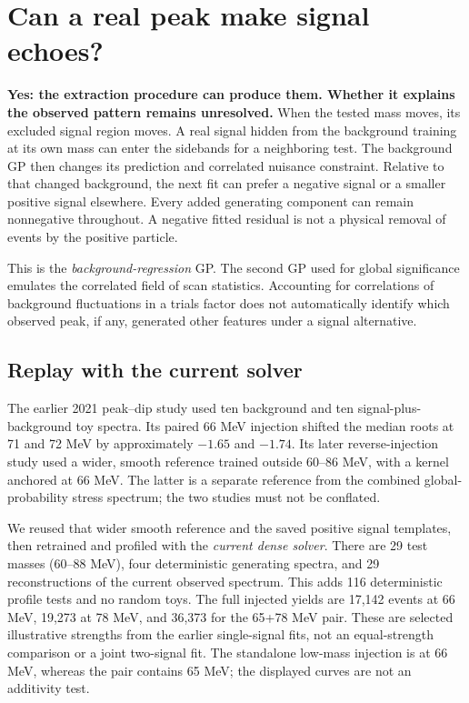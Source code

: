 \section{Can a real peak make signal echoes?}
\label{sec:echo}
\textbf{Yes: the extraction procedure can produce them. Whether it explains the observed pattern remains unresolved.} When the tested mass moves, its excluded signal region moves. A real signal hidden from the background training at its own mass can enter the sidebands for a neighboring test. The background GP then changes its prediction and correlated nuisance constraint. Relative to that changed background, the next fit can prefer a negative signal or a smaller positive signal elsewhere. Every added generating component can remain nonnegative throughout. A negative fitted residual is not a physical removal of events by the positive particle.

This is the \emph{background-regression} GP. The second GP used for global significance emulates the correlated field of scan statistics. Accounting for correlations of background fluctuations in a trials factor does not automatically identify which observed peak, if any, generated other features under a signal alternative.

\subsection*{Replay with the current solver}
The earlier 2021 peak--dip study used ten background and ten signal-plus-background toy spectra. Its paired 66 MeV injection shifted the median roots at 71 and 72 MeV by approximately $-1.65$ and $-1.74$. Its later reverse-injection study used a wider, smooth reference trained outside 60--86 MeV, with a kernel anchored at 66 MeV. The latter is a separate reference from the combined global-probability stress spectrum; the two studies must not be conflated.

We reused that wider smooth reference and the saved positive signal templates, then retrained and profiled with the \emph{current dense solver}. There are 29 test masses (60--88 MeV), four deterministic generating spectra, and 29 reconstructions of the current observed spectrum. This adds 116 deterministic profile tests and no random toys. The full injected yields are 17,142 events at 66 MeV, 19,273 at 78 MeV, and 36,373 for the 65+78 MeV pair. These are selected illustrative strengths from the earlier single-signal fits, not an equal-strength comparison or a joint two-signal fit. The standalone low-mass injection is at 66 MeV, whereas the pair contains 65 MeV; the displayed curves are not an additivity test.

